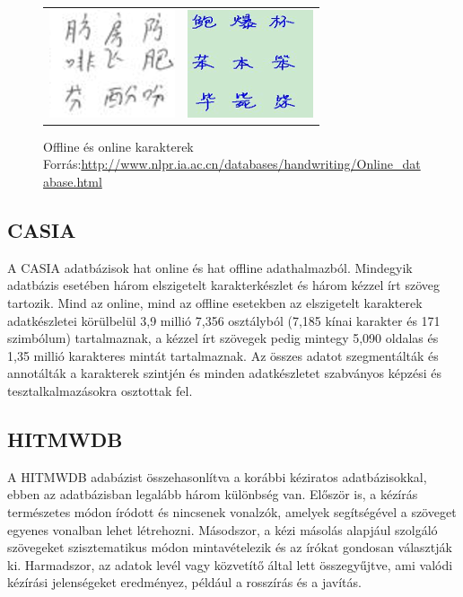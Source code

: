\begin{figure}[h]
\centering
\captionsetup{justification=centering}
\begin{tabular}{ l r }
\includegraphics[scale=1.2]{images/offlineChars} & \includegraphics[scale=1.2]{images/onlineChars}
\end{tabular}
\caption{Offline és online karakterek
\hspace{\textwidth}Forrás:\url{http://www.nlpr.ia.ac.cn/databases/handwriting/Online_database.html}}
\label{fig:offline_online}
\end{figure}

\subsection{CASIA} 

A CASIA adatbázisok hat online és hat offline adathalmazból. Mindegyik adatbázis esetében három elszigetelt karakterkészlet és három kézzel írt szöveg tartozik. Mind az online, mind az offline esetekben az elszigetelt karakterek adatkészletei körülbelül 3,9 millió 7,356 osztályból (7,185 kínai karakter és 171 szimbólum) tartalmaznak, a kézzel írt szövegek pedig mintegy 5,090 oldalas és 1,35 millió karakteres mintát tartalmaznak. Az összes adatot szegmentálták és annotálták a karakterek szintjén és minden adatkészletet szabványos képzési és tesztalkalmazásokra osztottak fel.

\subsection{HITMWDB}

A HITMWDB adabázist összehasonlítva a korábbi kéziratos adatbázisokkal, ebben az adatbázisban legalább három különbség van. Először is, a kézírás természetes módon íródott és nincsenek vonalzók, amelyek segítségével a szöveget egyenes vonalban lehet létrehozni. Másodszor, a kézi másolás alapjául szolgáló szövegeket szisztematikus módon mintavételezik és az írókat gondosan választják ki. Harmadszor, az adatok levél vagy közvetítő által lett összegyűjtve, ami valódi kézírási jelenségeket eredményez, például a rosszírás és a javítás.\\

